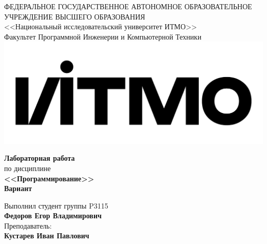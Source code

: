\begin{titlepage}
\thispagestyle{firststyle}
\begin{center}
    ФЕДЕРАЛЬНОЕ ГОСУДАРСТВЕННОЕ АВТОНОМНОЕ ОБРАЗОВАТЕЛЬНОЕ УЧРЕЖДЕНИЕ ВЫСШЕГО ОБРАЗОВАНИЯ\\
    \vspace{0.5cm}
<<Национальный исследовательский университет ИТМО>>\\
Факультет Программной Инженерии и Компьютерной Техники \\
\vspace{1cm}
    \includegraphics[scale=0.1]{img/itmo_logo.png}
\end{center}

\vspace{1cm}

\begin{center}
    \large
    \textbf{Лабораторная работа }\\
    по дисциплине\\
    \textbf{<<Программирование>>} \\
     \textbf{Вариант }
\end{center}

\vspace{2cm}

\begin{flushright}
  Выполнил студент  группы P3115\\
  \textbf{Федоров Егор Владимирович} \\
  Преподаватель: \\
  \textbf{Кустарев Иван Павлович}\\
\end{flushright}

\end{titlepage}
